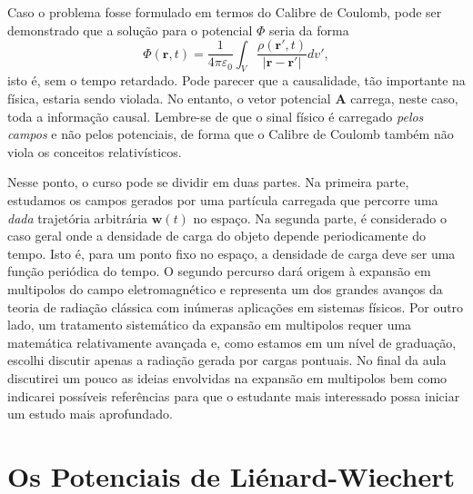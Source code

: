 \documentclass{article}
\begin{document}
Caso o problema fosse formulado em termos do Calibre de Coulomb, pode ser demonstrado que a solução para o potencial $\Phi$ seria da forma
\begin{equation}
    \Phi(\mathbf{r},t) = \frac{1}{4\pi\varepsilon_0}\int_{V}\frac{\rho(\mathbf{r}',t)}{|\mathbf{r} - \mathbf{r}'|}dv',
\end{equation}
isto é, sem o tempo retardado. Pode parecer que a causalidade, tão importante na física, estaria sendo violada. No entanto, o vetor potencial $\mathbf{A}$ carrega, neste caso, toda a informação causal. Lembre-se de que o sinal físico é carregado \textit{pelos campos} e não pelos potenciais, de forma que o Calibre de Coulomb também não viola os conceitos relativísticos.

Nesse ponto, o curso pode se dividir em duas partes. Na primeira parte, estudamos os campos gerados por uma partícula carregada que percorre uma \textit{dada} trajetória arbitrária $\mathbf{w}(t)$ no espaço. Na segunda parte, é considerado o caso geral onde a densidade de carga do objeto depende periodicamente do tempo. Isto é, para um ponto fixo no espaço, a densidade de carga deve ser uma função periódica do tempo. O segundo percurso dará origem à expansão em multipolos do campo eletromagnético e representa um dos grandes avanços da teoria de radiação clássica com inúmeras aplicações em sistemas físicos. Por outro lado, um tratamento sistemático da expansão em multipolos requer uma matemática relativamente avançada e, como estamos em um nível de graduação, escolhi discutir apenas a radiação gerada por cargas pontuais. No final da aula discutirei um pouco as ideias envolvidas na expansão em multipolos bem como indicarei possíveis referências para que o estudante mais interessado possa iniciar um estudo mais aprofundado.

\section{Os Potenciais de Liénard-Wiechert}
\end{document}
